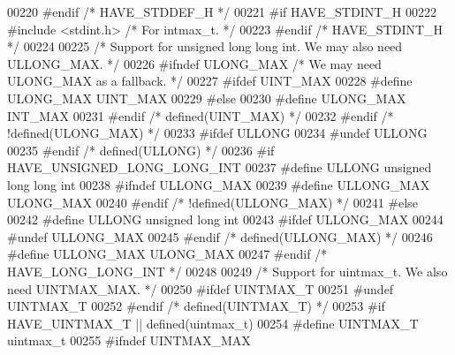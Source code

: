 \begin{DoxyCode}
{00220 \textcolor{preprocessor}{#endif  }\textcolor{comment}{/* HAVE\_STDDEF\_H */}\textcolor{preprocessor}{}
00221 \textcolor{preprocessor}{#if HAVE\_STDINT\_H}
00222 \textcolor{preprocessor}{#include <stdint.h>} \textcolor{comment}{/* For intmax\_t. */}
00223 \textcolor{preprocessor}{#endif  }\textcolor{comment}{/* HAVE\_STDINT\_H */}\textcolor{preprocessor}{}
00224 
00225 \textcolor{comment}{/* Support for unsigned long long int.  We may also need ULLONG\_MAX. */}
00226 \textcolor{preprocessor}{#ifndef ULONG\_MAX   }\textcolor{comment}{/* We may need ULONG\_MAX as a fallback. */}\textcolor{preprocessor}{}
00227 \textcolor{preprocessor}{#ifdef UINT\_MAX}
00228 \textcolor{preprocessor}{#define ULONG\_MAX UINT\_MAX}
00229 \textcolor{preprocessor}{#else}
00230 \textcolor{preprocessor}{#define ULONG\_MAX INT\_MAX}
00231 \textcolor{preprocessor}{#endif  }\textcolor{comment}{/* defined(UINT\_MAX) */}\textcolor{preprocessor}{}
00232 \textcolor{preprocessor}{#endif  }\textcolor{comment}{/* !defined(ULONG\_MAX) */}\textcolor{preprocessor}{}
00233 \textcolor{preprocessor}{#ifdef ULLONG}
00234 \textcolor{preprocessor}{#undef ULLONG}
00235 \textcolor{preprocessor}{#endif  }\textcolor{comment}{/* defined(ULLONG) */}\textcolor{preprocessor}{}
00236 \textcolor{preprocessor}{#if HAVE\_UNSIGNED\_LONG\_LONG\_INT}
00237 \textcolor{preprocessor}{#define ULLONG unsigned long long int}
00238 \textcolor{preprocessor}{#ifndef ULLONG\_MAX}
00239 \textcolor{preprocessor}{#define ULLONG\_MAX ULONG\_MAX}
00240 \textcolor{preprocessor}{#endif  }\textcolor{comment}{/* !defined(ULLONG\_MAX) */}\textcolor{preprocessor}{}
00241 \textcolor{preprocessor}{#else}
00242 \textcolor{preprocessor}{#define ULLONG unsigned long int}
00243 \textcolor{preprocessor}{#ifdef ULLONG\_MAX}
00244 \textcolor{preprocessor}{#undef ULLONG\_MAX}
00245 \textcolor{preprocessor}{#endif  }\textcolor{comment}{/* defined(ULLONG\_MAX) */}\textcolor{preprocessor}{}
00246 \textcolor{preprocessor}{#define ULLONG\_MAX ULONG\_MAX}
00247 \textcolor{preprocessor}{#endif  }\textcolor{comment}{/* HAVE\_LONG\_LONG\_INT */}\textcolor{preprocessor}{}
00248 
00249 \textcolor{comment}{/* Support for uintmax\_t.  We also need UINTMAX\_MAX. */}
00250 \textcolor{preprocessor}{#ifdef UINTMAX\_T}
00251 \textcolor{preprocessor}{#undef UINTMAX\_T}
00252 \textcolor{preprocessor}{#endif  }\textcolor{comment}{/* defined(UINTMAX\_T) */}\textcolor{preprocessor}{}
00253 \textcolor{preprocessor}{#if HAVE\_UINTMAX\_T || defined(uintmax\_t)}
00254 \textcolor{preprocessor}{#define UINTMAX\_T uintmax\_t}
00255 \textcolor{preprocessor}{#ifndef UINTMAX\_MAX}
}
\end{DoxyCode}
